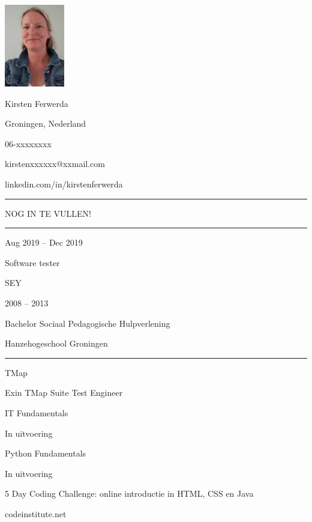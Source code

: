 \documentclass[a4paper,12pt,twoside]{article}
\newlength{\cvcolumngapwidth}
\newlength{\cvleftcolumnwidth}
\newlength{\cvrightcolumnwidth}
\newcommand{\cvnamestyle}[1]{{\Large\cvnamefont\textcolor{cvnamecolor}{#1}}}
\newcommand{\cvsectionstyle}[1]{{\normalsize\cvsectionfont\textcolor{cvsectioncolor}{#1}}}
\newcommand{\cvtitlestyle}[1]{{\large\cvtitlefont\textcolor{cvtitlecolor}{#1}}}
\newcommand{\cvdurationstyle}[1]{{\small\cvdurationfont\textcolor{cvdurationcolor}{#1}}}
\newlength{\cvafteritemskipamount}
\newlength{\cvaftersectionskipamount}
\newlength{\cvafternameskipamount}
\newlength{\cvafterpersonalinfolineskipamount}
\newlength{\cvaftertitleskipamount}
\newlength{\cvparskip}
\newcommand{\cvpersonalinfo}[2]{
    \begin{minipage}[t]{\cvleftcolumnwidth}
        \vspace{0mm} %
        \raggedleft #1
    \end{minipage}%
    \hspace{\cvcolumngapwidth}%
    \begin{minipage}[t]{\cvrightcolumnwidth}
        \vspace{0mm} %
        #2
    \end{minipage}

    \vspace{\cvafteritemskipamount}
}
\newcommand{\cvname}[1]{
    \cvnamestyle{#1}

    \vspace{\cvafternameskipamount}
}
\newcommand{\cvpersonalinfolinewithicon}[3]{
    \raisebox{.5\fontcharht\font`E-.5\height}{\texttt{[image: \#2]}}
    #3

    \vspace{\cvafterpersonalinfolineskipamount}
}
\newcommand{\cvsection}[1]{
    \begin{minipage}[t]{\cvleftcolumnwidth}
        \raggedleft\cvsectionstyle{#1}
    \end{minipage}%
    \hspace{\cvcolumngapwidth}%
    \begin{minipage}[t]{\cvrightcolumnwidth}
        \textcolor{cvrulecolor}{\rule{\cvrightcolumnwidth}{0.3mm}}
    \end{minipage}

    \vspace{\cvaftersectionskipamount}
}
\newcommand{\cvitem}[2]{
    \begin{minipage}[t]{\cvleftcolumnwidth}
        \raggedleft #1
    \end{minipage}%
    \hspace{\cvcolumngapwidth}%
    \begin{minipage}[t]{\cvrightcolumnwidth}
        \setlength{\parskip}{\cvparskip} #2
    \end{minipage}

    \vspace{\cvafteritemskipamount}
}
\newcommand{\cvtitle}[1]{
    \cvtitlestyle{#1}

    \vspace{\cvaftertitleskipamount}
    \vspace{-\cvparskip}
}
\begin{document}
\cvpersonalinfo{
    
    \includegraphics[height=36mm]{Pasfoto.png}
}{
    
    \cvname{Kirsten Ferwerda}

    
    \cvpersonalinfolinewithicon{height=4mm}{072-location.pdf}{
        Groningen, Nederland
    }

    \cvpersonalinfolinewithicon{height=4mm}{067-phone.pdf}{
        06-xxxxxxxx
    }

    
    \cvpersonalinfolinewithicon{height=4mm}{070-envelop.pdf}{
        kirstenxxxxxx@xxmail.com
    }

    
    \cvpersonalinfolinewithicon{height=4mm}{458-linkedin.pdf}{
        linkedin.com/in/kirstenferwerda
    }

}  




\cvsection{PROFIEL}
    \begin{description}
	\item {\cvsectionfont NOG IN TE VULLEN!} 
    \end{description}
\bigskip

\cvsection{OPLEIDING}


\cvitem{
    \cvdurationstyle{Aug 2019 -- Dec 2019}
}{
    \cvtitle{Software tester}

    SEY

    
}

\cvitem{
    \cvdurationstyle{2008 -- 2013}
}{
    \cvtitle{Bachelor Sociaal Pedagogische Hulpverlening}

   Hanzehogeschool Groningen 
   
}

\cvsection{\cvsectionfont{CERTIFICATEN}}

\cvitem{\cvdurationstyle{}
}{  
    \cvtitle{TMap} 
    
    Exin TMap Suite Test Engineer
    
}
\cvitem{\cvdurationstyle{}
}{

    \cvtitle{IT Fundamentals} 

    In uitvoering
    
}
\cvitem{\cvdurationstyle{}
}{
    \cvtitle{Python Fundamentals} 
    
    In uitvoering
    
}
\cvitem{\cvdurationstyle{}
}{
    \cvtitle{5 Day Coding Challenge: online introductie in HTML, CSS en Java} 
    
    codeinstitute.net

    
}
\end{document}
